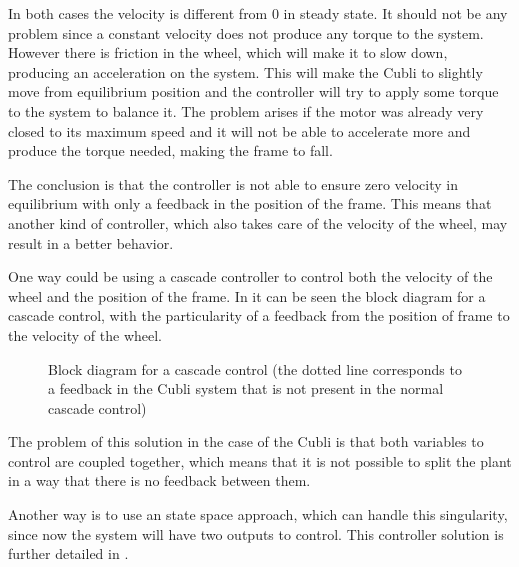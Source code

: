 In both cases the velocity is different from 0 in steady state. It should not be any problem since a constant velocity does not produce any torque 
to the system. However there is friction in the wheel, which will make it to slow down, producing an acceleration on the system. This will make the Cubli to slightly move from equilibrium position and the controller will try to apply some torque to the system to balance it. The problem arises if the motor was already very closed to its maximum speed and it will not be able to accelerate more and produce the torque needed, making the frame to fall.

The conclusion is that the controller is not able to ensure zero velocity in equilibrium with only a feedback in the position of the frame. This means that another kind of controller, which also takes care of the velocity of the wheel, may result in a better behavior.

One way could be using a cascade controller to control both the velocity of the wheel and the position of the frame. In  it can be seen the block diagram for a cascade control, with the particularity of a feedback from the position of frame to the velocity of the wheel.

\begin{figure}[H]
	
	\centering
	\caption{Block diagram for a cascade control (the dotted line corresponds to a feedback in the Cubli system that is not present in the normal cascade control)}
	\label{cascadeControl}
\end{figure}

The problem of this solution in the case of the Cubli is that both variables to control are coupled together, which means that it is not possible to split the plant in a way that there is no feedback between them. 

Another way is to use an state space approach, which can handle this singularity, since now the system will have two outputs to control. This controller solution is further detailed in .
